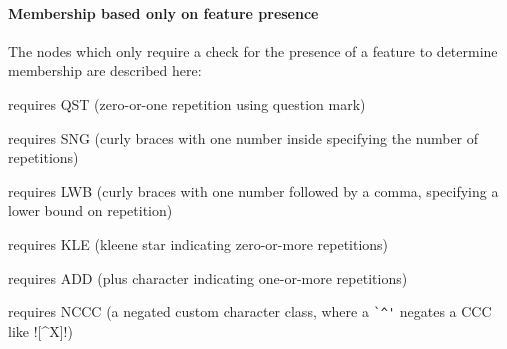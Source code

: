 \paragraph{Membership based only on feature presence}
The nodes which only require a check for the presence of a feature to determine membership are described here:
\begin{description} \itemsep -1pt
\item[D2] requires QST (zero-or-one repetition using question mark)
\item[S1] requires SNG (curly braces with one number inside specifying the number of repetitions)
\item[L1] requires LWB (curly braces with one number followed by a comma, specifying a lower bound on repetition)
\item[L2] requires KLE (kleene star indicating zero-or-more repetitions)
\item[L3] requires ADD (plus character indicating one-or-more repetitions)
\item[C3] requires NCCC (a negated custom character class, where a \verb!`^'! negates a CCC like \cverb![^X]!)
\end{description}

